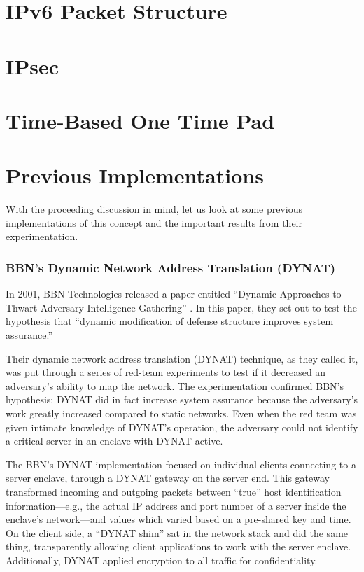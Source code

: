 \section{IPv6 Packet Structure}
\label{sec:ipv6}

\section{IPsec}
\label{sec:ipsec}

\section{Time-Based One Time Pad}
\label{sec:totp}


\section{Previous Implementations}
\label{sec:related_research}
\par With the proceeding discussion in mind, let us look at some previous implementations of this concept and the important results from their experimentation.

\subsubsection{BBN's Dynamic Network Address Translation (DYNAT)}
\par In 2001, BBN Technologies released a paper entitled ``Dynamic Approaches to Thwart Adversary Intelligence Gathering'' \cite{BBNDYNAT}. In this paper, they set out to test the hypothesis that ``dynamic modification of defense structure improves system assurance.''

\par Their dynamic network address translation (DYNAT) technique, as they called it, was put through a series of red-team experiments to test if it decreased an adversary's ability to map the network. The experimentation confirmed BBN's hypothesis: DYNAT did in fact increase system assurance because the adversary's work greatly increased compared to static networks. Even when the red team was given intimate knowledge of DYNAT's operation, the adversary could not identify a critical server in an enclave with DYNAT active.

\par The BBN's DYNAT implementation focused on individual clients connecting to a server enclave, through a DYNAT gateway on the server end. This gateway transformed incoming and outgoing packets between ``true'' host identification information---e.g., the actual IP address and port number of a server inside the enclave's network---and values which varied based on a pre-shared key and time. On the client side, a ``DYNAT shim'' sat in the network stack and did the same thing, transparently allowing client applications to work with the server enclave. Additionally, DYNAT applied encryption to all traffic for confidentiality.

